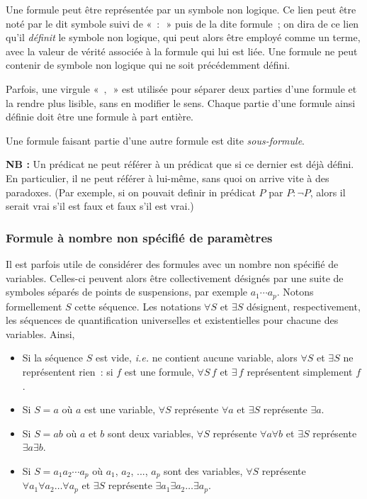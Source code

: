 Une formule peut être représentée par un symbole non logique. 
Ce lien peut être noté par le dit symbole suivi de « $:$ » puis de la dite formule ; on dira de ce lien qu'il \textit{définit} le symbole non logique, qui peut alors être employé comme un terme, avec la valeur de vérité associée à la formule qui lui est liée. 
Une formule ne peut contenir de symbole non logique qui ne soit précédemment défini. 

Parfois, une virgule « $,$ » est utilisée pour séparer deux parties d'une formule et la rendre plus lisible, sans en modifier le sens. 
Chaque partie d'une formule ainsi définie doit être une formule à part entière. 

Une formule faisant partie d'une autre formule est dite \textit{sous-formule}.

\medskip

\noindent\textbf{NB :} Un prédicat ne peut référer à un prédicat que si ce dernier est déjà défini. En particulier, il ne peut référer à lui-même, sans quoi on arrive vite à des paradoxes. (Par exemple, si on pouvait definir in prédicat $P$ par $P: \neg P$, alors il serait vrai s'il est faux et faux s'il est vrai.)

\subsubsection{Formule à nombre non spécifié de paramètres}

Il est parfois utile de considérer des formules avec un nombre non spécifié de variables. 
Celles-ci peuvent alors être collectivement désignés par une suite de symboles séparés de points de suspensions, par exemple $a_1 \cdots a_p$. 
Notons formellement $S$ cette séquence.
Les notations $\forall S$ et $\exists S$ désignent, respectivement, les séquences de quantification universelles et existentielles pour chacune des variables. 
Ainsi, 
\begin{itemize}[nosep]
    \item Si la séquence $S$ est vide, \textit{i.e.} ne contient aucune variable, alors $\forall S$ et $\exists S$ ne représentent rien : si $f$ est une formule, $\forall S \, f$ et $\exists \, f$ représentent simplement $f$.
    \item Si $S = a$ où $a$ est une variable, $\forall S$ représente $\forall a$ et $\exists S$ représente $\exists a$. 
    \item Si $S = a b$ où $a$ et $b$ sont deux variables, $\forall S$ représente $\forall a \forall b$ et $\exists S$ représente $\exists a \exists b$. 
    \item Si $S = a_1 a_2 \cdots a_p$ où $a_1$, $a_2$, ..., $a_p$ sont des variables, $\forall S$ représente $\forall a_1 \forall a_2 \dots \forall a_p$ et $\exists S$ représente $\exists a_1 \exists a_2 \dots \exists a_p$. 
\end{itemize}


